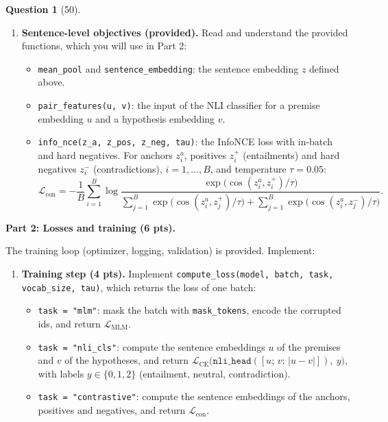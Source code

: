 \documentclass[12pt]{article}
\theoremstyle{definition}
\newtheorem{exercise}{Question}%
\begin{document}
\begin{exercise}[50]
\begin{enumerate}
  \item \textbf{Sentence-level objectives (provided).} Read and understand the provided functions, which you will use in
  Part 2:
  \begin{itemize}
    \item \texttt{mean\_pool} and \texttt{sentence\_embedding}: the sentence embedding $z$ defined above.
    \item \texttt{pair\_features(u, v)}: the input of the NLI classifier for a premise embedding $u$ and a
          hypothesis embedding $v$.
    \item \texttt{info\_nce(z\_a, z\_pos, z\_neg, tau)}: the InfoNCE loss with in-batch and hard negatives. For
          anchors $z^a_i$, positives $z^+_i$ (entailments) and hard negatives $z^-_i$ (contradictions),
          $i = 1, \dots, B$, and temperature $\tau = 0.05$:
          \[
            \mathcal{L}_{\text{con}} = -\frac{1}{B} \sum_{i=1}^{B} \log
              \frac{\exp\!\big(\cos(z^a_i, z^+_i)/\tau\big)}
                   {\sum_{j=1}^{B} \exp\!\big(\cos(z^a_i, z^+_j)/\tau\big)
                    + \sum_{j=1}^{B} \exp\!\big(\cos(z^a_i, z^-_j)/\tau\big)}.
          \]
  \end{itemize}
\end{enumerate}

\textbf{Part 2: Losses and training (6 pts).}

The training loop (optimizer, logging, validation) is provided. Implement:

\begin{enumerate}
  \item \textbf{Training step (4 pts).} Implement \texttt{compute\_loss(model, batch, task, vocab\_size, tau)}, which
  returns the loss of one batch:
  \begin{itemize}
    \item \texttt{task = "mlm"}: mask the batch with \texttt{mask\_tokens}, encode the corrupted ids, and
          return $\mathcal{L}_{\text{MLM}}$.
    \item \texttt{task = "nli\_cls"}: compute the sentence embeddings $u$ of the premises and $v$ of the hypotheses,
          and return $\mathcal{L}_{\text{CE}}\big(\texttt{nli\_head}([u;\, v;\, |u - v|]),\ y\big)$, with labels
          $y \in \{0, 1, 2\}$ (entailment, neutral, contradiction).
    \item \texttt{task = "contrastive"}: compute the sentence embeddings of the anchors, positives and negatives,
          and return $\mathcal{L}_{\text{con}}$.
  \end{itemize}


\end{enumerate}
\end{exercise}
\end{document}

